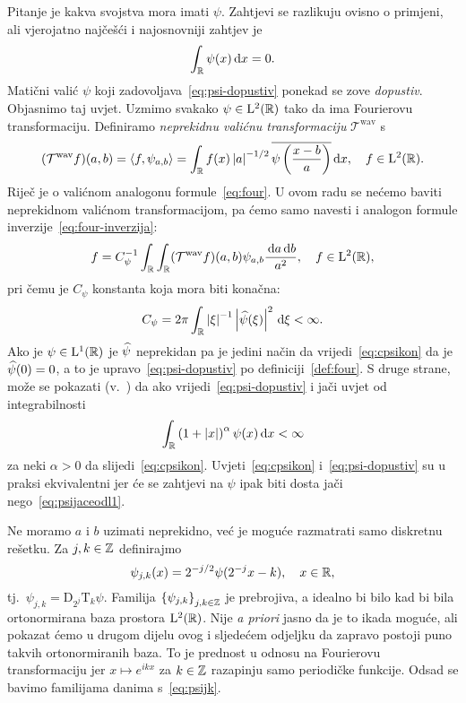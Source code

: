 \documentclass[main.tex]{subfiles}
\newcommand{\mr}[1]{\mathrm{#1}}
\newcommand{\mc}[1]{\mathcal{#1}}
\begin{document}
Pitanje je kakva svojstva mora imati \( \psi \). Zahtjevi se razlikuju ovisno o primjeni,
ali vjerojatno najčešći i najosnovniji zahtjev je
\begin{equation}\label{eq:psi-dopustiv}
	\int_{\mathbb{R}} \psi(x) \,\mathrm d x = 0.
\end{equation}
Matični valić \( \psi \) koji zadovoljava~\eqref{eq:psi-dopustiv} ponekad se zove \emph{dopustiv}.
Objasnimo taj uvjet. Uzmimo svakako \( \psi \in \mathrm{L}^2(\mathbb{R}) \) tako da ima
Fourierovu transformaciju. Definiramo \emph{neprekidnu valićnu transformaciju} \( {\mc T^{\mr{wav}}} \) s
\begin{equation}\label{eq:cwt}
	(\mc T^{\mr{wav}} f)(a,b) = \skp f{\psi_{a,b}} =
	\int_\R f(x) \abs a^{-1/2} \ol{\psi\left( \frac{x-b}a \right)} \D x, \quad f \in \L^2(\R).
\end{equation}
Riječ je o valićnom analogonu formule~\eqref{eq:four}.
U ovom radu se nećemo baviti neprekidnom valićnom transformacijom, pa ćemo
samo navesti i analogon formule inverzije~\eqref{eq:four-inverzija}:
\begin{equation}\label{eq:wav-inverzija}
	f = C_\psi^{-1} \int_\R \int_\R
	(\mc T^{\mr{wav}} f)(a,b) \psi_{a,b} \frac{\D a \D b}{a^2}, \quad f \in \L^2(\R),
\end{equation}
pri čemu je \( C_\psi \) konstanta koja mora biti konačna:
\begin{equation}\label{eq:cpsikon}
	C_\psi = 2\pi \int_{\mathbb{R}} \left| {\xi} \right| ^{-1} \left| {\widehat{\psi}(\xi)} \right|^2 \,\mathrm d \xi < \infty.
\end{equation}
Ako je \( \psi \in \mathrm{L}^1(\mathbb{R}) \) je \( \widehat{\psi} \)
neprekidan pa je jedini način da vrijedi~\eqref{eq:cpsikon}
da je \( \widehat{\psi} (0)=0 \), a to je
upravo~\eqref{eq:psi-dopustiv} po definiciji~\ref{def:four}.
S druge strane, može se pokazati (v.~\cite[]{daub}) da ako vrijedi~\eqref{eq:psi-dopustiv}
i jači uvjet od integrabilnosti
\begin{equation}\label{eq:psijaceodl1}
	\int_{\mathbb{R}} \left( 1 + \left| {x} \right| \right)^\alpha \psi(x) \,\mathrm d x < \infty
\end{equation}
za neki \( \alpha > 0 \) da slijedi~\eqref{eq:cpsikon}.
Uvjeti~\eqref{eq:cpsikon} i~\eqref{eq:psi-dopustiv} su u
praksi ekvivalentni jer će se zahtjevi na \( \psi \)
ipak biti dosta jači nego~\eqref{eq:psijaceodl1}.

Ne moramo \( a \) i \( b \) uzimati neprekidno, već je moguće
razmatrati samo diskretnu rešetku. Za \( j, k \in \mathbb{Z} \) definirajmo
\begin{equation}\label{eq:psijk}
	\psi_{j, k}(x) = 2^{-j/2} \psi(2^{-j}x-k), \quad x \in \mathbb{R},
\end{equation}
tj.\ \( \psi_{j,k} = \mr D_{2^j}\mr T_k \psi \). Familija
\( \left\{ \psi_{j,k} \right\}_{j,k\in\mathbb{Z}} \) je prebrojiva, a
idealno bi bilo kad bi bila ortonormirana baza prostora \( \mathrm{L}^2(\mathbb{R}) \).
Nije \emph{a priori} jasno da je to ikada moguće, ali
pokazat ćemo u drugom dijelu ovog i sljedećem odjeljku da
zapravo postoji puno takvih ortonormiranih baza.
To je prednost u odnosu na Fourierovu transformaciju jer
\( x \mapsto e^{ikx} \) za \( k \in \mathbb{Z} \) razapinju
samo periodičke funkcije. Odsad se bavimo familijama danima s~\eqref{eq:psijk}.
\end{document}
